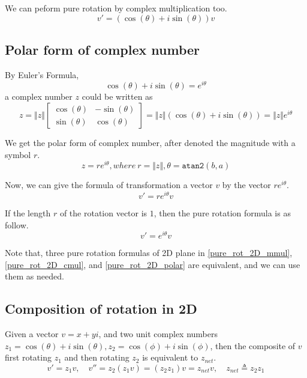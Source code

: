 \documentclass[runningheads]{llncs}
\newcommand{\Clen}[1]{\Vert #1\Vert}
\newcommand{\bmatL}{\begin{bmatrix}}
\newcommand{\bmatR}{\end{bmatrix}}
\begin{document}
We can peform pure rotation by complex multiplication too.
\begin{equation}\label{pure_rot_2D_cmul}
  v'= (\cos(\theta)+i\sin(\theta))v
\end{equation}

\subsection{Polar form of complex number}

By Euler's Formula,
\begin{equation}
  \cos(\theta)+i\sin(\theta)=e^{i\theta}
\end{equation}
a complex number $z$ could be written as
\begin{equation}
  z=\Clen{z}\bmatL \cos(\theta)&-\sin(\theta)\\\sin(\theta)&\cos(\theta)\bmatR
  =\Clen{z}(\cos(\theta)+i\sin(\theta))=\Clen{z}e^{i\theta}
\end{equation}

We get the polar form of complex number, after denoted the magnitude with a symbol $r$.
\begin{equation}
  z=re^{i\theta}, where~r=\Clen{z},\theta=\mathtt{atan2}(b,a)
\end{equation}

Now, we can give the formula of transformation a vector $v$ by the vector $re^{i\theta}$.
\begin{equation}
  v'=re^{i\theta}v
\end{equation}

If the length $r$ of the rotation vector is $1$, then the pure rotation formula is as follow.
\begin{equation}\label{pure_rot_2D_polar}
  v'=e^{i\theta}v
\end{equation}

Note that, three pure rotation formulas of 2D plane in \eqref{pure_rot_2D_mmul}, \eqref{pure_rot_2D_cmul}, and \eqref{pure_rot_2D_polar} are equivalent, and we can use them as needed.

\subsection{Composition of rotation in 2D}
Given a vector $v=x+yi$, and two unit complex numbers $z_1=\cos(\theta)+i\sin(\theta), z_2=\cos(\phi)+i\sin(\phi)$,
then the composite of $v$ first rotating $z_1$ and then rotating $z_2$ is equivalent to $z_{net}$.
\begin{equation}
  v'=z_1v,\quad v''=z_2(z_1v)=(z_2z_1)v=z_{net}v,\quad z_{net}\triangleq z_2z_1
\end{equation}
\end{document}
